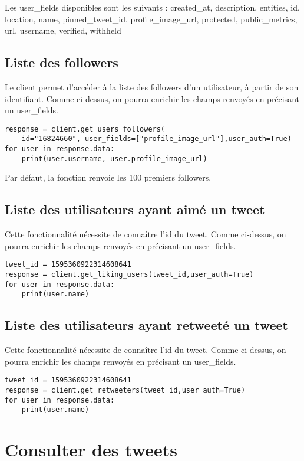 \documentclass[11pt,a4paper]{article}
\begin{document}
Les user\_fields disponibles sont les suivants : 
created\_at, description, entities, id, location, name, pinned\_tweet\_id, profile\_image\_url, protected, public\_metrics, url, username, verified, withheld

\subsection{Liste des followers}

Le client permet d'accéder à la liste des followers d'un utilisateur, à partir de son identifiant. Comme ci-dessus, on pourra enrichir les champs renvoyés en précisant un user\_fields.

\begin{lstlisting}
response = client.get_users_followers(
    id="16824660", user_fields=["profile_image_url"],user_auth=True)
for user in response.data:
    print(user.username, user.profile_image_url)
\end{lstlisting}

Par défaut, la fonction renvoie les 100 premiers followers.
\subsection{Liste des utilisateurs ayant aimé un tweet}
Cette fonctionnalité nécessite de connaître l'id du tweet. Comme ci-dessus, on pourra enrichir les champs renvoyés en précisant un user\_fields.
\begin{lstlisting}
tweet_id = 1595360922314608641
response = client.get_liking_users(tweet_id,user_auth=True)
for user in response.data:
    print(user.name)
\end{lstlisting}


\subsection{Liste des utilisateurs ayant retweeté un tweet}
Cette fonctionnalité nécessite de connaître l'id du tweet. Comme ci-dessus, on pourra enrichir les champs renvoyés en précisant un user\_fields.
\begin{lstlisting}
tweet_id = 1595360922314608641
response = client.get_retweeters(tweet_id,user_auth=True)
for user in response.data:
    print(user.name)
\end{lstlisting}

\section{Consulter des tweets}
\end{document}
